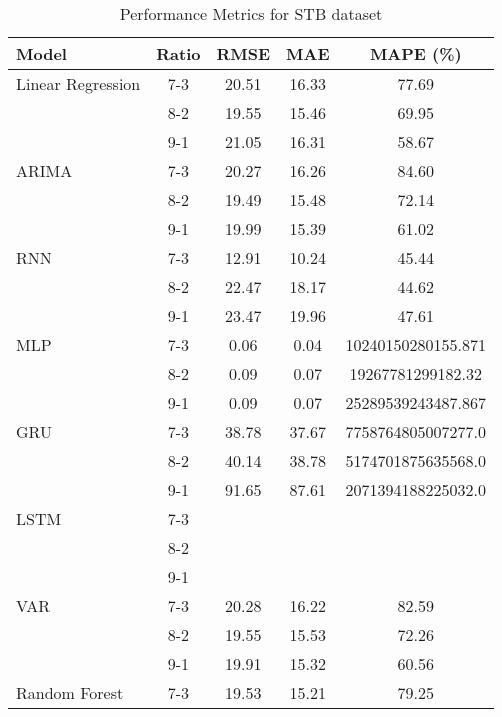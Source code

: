 \begin{table}[h!]
    \centering
    \caption{Performance Metrics for STB dataset}
    \begin{tabular}{|l|c|c|c|c|}
    \hline
    \rowcolor{orange!30} \textbf{Model} & \textbf{Ratio} & \textbf{RMSE} & \textbf{MAE} & \textbf{MAPE (\%)} \\ \hline
    \rowcolor{white} Linear Regression & 7-3 & 20.51 & 16.33 & 77.69 \\ \hline
    \rowcolor{white}  & 8-2 & 19.55 & 15.46 & 69.95 \\ \hline
    \rowcolor{white}  & 9-1 & 21.05 & 16.31 & 58.67 \\ \hline
    \rowcolor{white} ARIMA & 7-3 & 20.27 & 16.26 & 84.60 \\ \hline
    \rowcolor{white}  & 8-2 & 19.49 & 15.48 & 72.14 \\ \hline
    \rowcolor{white}  & 9-1 & 19.99 & 15.39 & 61.02 \\ \hline
    \rowcolor{white} RNN & 7-3 & 12.91 & 10.24 & 45.44 \\ \hline
    \rowcolor{white}  & 8-2 & 22.47 & 18.17 & 44.62 \\ \hline
    \rowcolor{white}  & 9-1 & 23.47 & 19.96 & 47.61 \\ \hline
    \rowcolor{white} MLP & 7-3 & 0.06 & 0.04& 10240150280155.871 \\ \hline
    \rowcolor{white}  & 8-2 & 0.09 & 0.07 & 19267781299182.32 \\ \hline
    \rowcolor{white}  & 9-1 & 0.09 & 0.07& 25289539243487.867  \\ \hline
    \rowcolor{white} GRU & 7-3 & 38.78 & 37.67 & 7758764805007277.0 \\ \hline
    \rowcolor{white}  & 8-2 & 40.14 & 38.78 & 5174701875635568.0 \\ \hline
    \rowcolor{white}  & 9-1 & 91.65 & 87.61 & 2071394188225032.0 \\ \hline
    \rowcolor{white} LSTM & 7-3 &  &  &  \\ \hline
    \rowcolor{white}  & 8-2 &  &  &  \\ \hline
    \rowcolor{white}  & 9-1 &  &  &  \\ \hline
    \rowcolor{white} VAR & 7-3 & 20.28 & 16.22 & 82.59 \\ \hline
    \rowcolor{white}  & 8-2 & 19.55 & 15.53 & 72.26 \\ \hline
    \rowcolor{white}  & 9-1 & 19.91 & 15.32 & 60.56 \\ \hline
    \rowcolor{white} Random Forest & 7-3 & 19.53 & 15.21 & 79.25 \\ \hline

\end{tabular}
\end{table}
